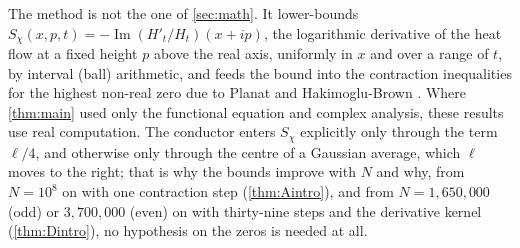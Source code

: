 \documentclass[11pt]{article}
\theoremstyle{definition}
\newcommand{\im}{\operatorname{Im}}
\begin{document}
\noindent
The method is not the one of \cref{sec:math}. It lower-bounds $S_\chi(x,p,t) = -\im(H'_t/H_t)(x+ip)$, the logarithmic derivative of the heat flow at a fixed height $p$ above the real axis, uniformly in $x$ and over a range of $t$, by interval (ball) arithmetic, and feeds the bound into the contraction inequalities for the highest non-real zero due to Planat \cite{Planat2026} and Hakimoglu-Brown \cite{HakimogluBrown2026}. Where \cref{thm:main} used only the functional equation and complex analysis, these results use real computation. The conductor enters $S_\chi$ explicitly only through the term $\ell/4$, and otherwise only through the centre of a Gaussian average, which $\ell$ moves to the right; that is why the bounds improve with $N$ and why, from $N = 10^8$ on with one contraction step (\cref{thm:Aintro}), and from $N = 1{,}650{,}000$ (odd) or $3{,}700{,}000$ (even) on with thirty-nine steps and the derivative kernel (\cref{thm:Dintro}), no hypothesis on the zeros is needed at all.
\end{document}
